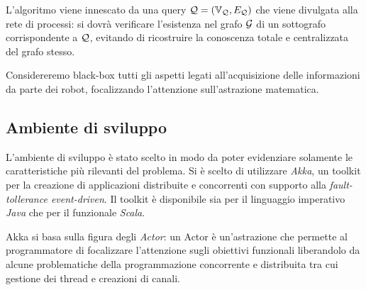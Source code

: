\documentclass{llncs}
\begin{document}
L'algoritmo viene innescato da una query $\mathcal{Q} = (\mathbb{V}_{\mathcal{Q}}, E_{\mathcal{Q}})$
che viene divulgata alla rete di processi: si dovrà verificare
l'esistenza nel grafo $\mathcal{G}$ di un sottografo corrispondente a $\mathcal{Q}$,
evitando di ricostruire la conoscenza totale e centralizzata del
grafo stesso.

Considereremo black-box tutti gli aspetti legati all'acquisizione delle informazioni
da parte dei robot, focalizzando l'attenzione sull'astrazione matematica.
%
%
\subsection{Ambiente di sviluppo}
L'ambiente di sviluppo è stato scelto in modo da poter evidenziare solamente
le caratteristiche più rilevanti del problema.
Si è scelto di utilizzare \emph{Akka}, un toolkit per la creazione di applicazioni
distribuite e concorrenti con supporto alla \emph{fault-tollerance event-driven}.
Il toolkit è disponibile sia per il linguaggio imperativo \emph{Java} che per il
funzionale \emph{Scala}.

Akka si basa sulla figura degli \emph{Actor}: un Actor è un'astrazione che permette
al programmatore di focalizzare l'attenzione sugli obiettivi funzionali liberandolo
da alcune problematiche della programmazione
concorrente e distribuita tra cui gestione dei thread e creazioni di canali.
%
\end{document}
